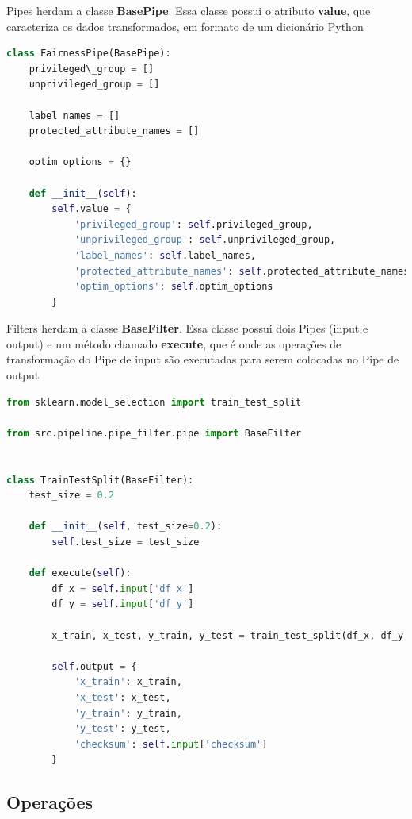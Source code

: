 \documentclass[portugues]{ic-tese}
\begin{document}
Pipes herdam a classe \textbf{BasePipe}. Essa classe possui o atributo \textbf{value}, que caracteriza os dados transformados, em formato de um dicionário Python

\begin{lstlisting}[language=Python, label=cod:FairnessPipeClass]
class FairnessPipe(BasePipe):
    privileged\_group = []
    unprivileged_group = []

    label_names = []
    protected_attribute_names = []

    optim_options = {}

    def __init__(self):
        self.value = {
            'privileged_group': self.privileged_group,
            'unprivileged_group': self.unprivileged_group,
            'label_names': self.label_names,
            'protected_attribute_names': self.protected_attribute_names,
            'optim_options': self.optim_options
        }
\end{lstlisting}

Filters herdam a classe \textbf{BaseFilter}. Essa classe possui dois Pipes (input e output) e um método chamado \textbf{execute}, que é onde as operações de transformação do Pipe de input são executadas para serem colocadas no Pipe de output

\begin{lstlisting}[language=Python, label=cod:TrainTestSplitClass]
from sklearn.model_selection import train_test_split

from src.pipeline.pipe_filter.pipe import BaseFilter


class TrainTestSplit(BaseFilter):
    test_size = 0.2

    def __init__(self, test_size=0.2):
        self.test_size = test_size

    def execute(self):
        df_x = self.input['df_x']
        df_y = self.input['df_y']

        x_train, x_test, y_train, y_test = train_test_split(df_x, df_y, test_size=self.test_size, random_state=42)

        self.output = {
            'x_train': x_train,
            'x_test': x_test,
            'y_train': y_train,
            'y_test': y_test,
            'checksum': self.input['checksum']
        }
\end{lstlisting}

\subsection{Operações}
\end{document}
